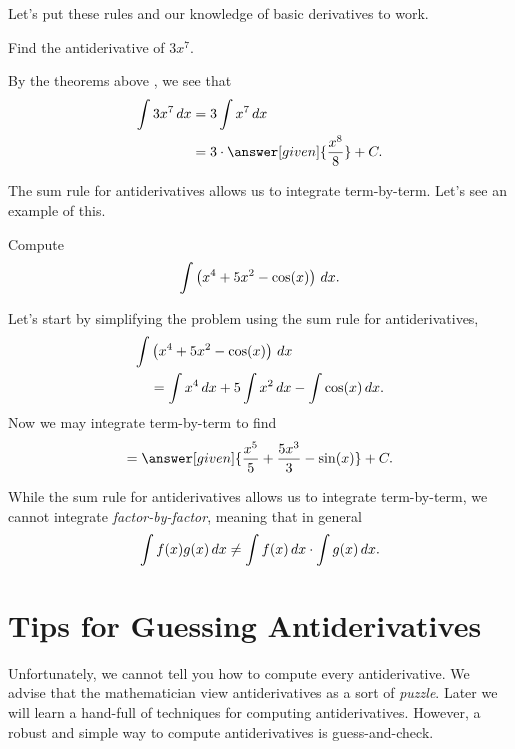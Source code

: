 \documentclass{ximera}
\begin{document}
Let's put these rules and our knowledge of basic derivatives to work.

\begin{example}
Find the antiderivative of $3 x^7$.
\begin{explanation}
By the theorems above , we see that
\begin{align*}
\int 3 x^7 \d x &= 3 \int x^7 \d x\\
&= 3 \cdot \answer[given]{\frac{x^8}{8}}+C.
\end{align*}
\end{explanation}
\end{example}

The sum rule for antiderivatives allows us to integrate
term-by-term. Let's see an example of this.

\begin{example}
Compute
\[
\int \left(x^4 + 5x^2 - \cos(x)\right) \,d x.
\]
\begin{explanation}
Let's start by simplifying the problem using the sum rule for
antiderivatives, 
\begin{align*}
\int &\left(x^4 + 5x^2 - \cos(x)\right) \,d x\\
&= \int x^4 \,d x + 5\int x^2 \,d x - \int \cos(x) \,d x.
\end{align*}
Now we may integrate term-by-term to find
\[
= \answer[given]{\frac{x^5}{5} + \frac{5x^3}{3}  - \sin(x)}+C.
\]
\end{explanation}
\end{example}


\begin{warning}
While the sum rule for antiderivatives allows us to integrate
term-by-term, we cannot integrate \textit{factor-by-factor}, meaning
that in general
\[
\int f(x)g(x) \,d x \ne \int f(x) \,d x\cdot \int g(x) \,d x.
\]
\end{warning}








\section{Tips for Guessing Antiderivatives}


Unfortunately, we cannot tell you how to compute every antiderivative.
We advise that the mathematician view antiderivatives as a sort of
\textit{puzzle}. Later we will learn a hand-full of techniques for
computing antiderivatives. However, a robust and simple way to compute
antiderivatives is guess-and-check.
\end{document}
